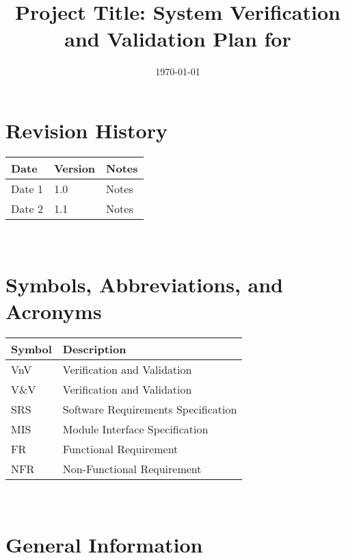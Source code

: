 \documentclass[12pt, titlepage]{article}
\begin{document}
\title{Project Title: System Verification and Validation Plan for \progname{}} 
\author{\authname}
\date{\today}
	
\maketitle


\section*{Revision History}

\begin{tabularx}{\textwidth}{p{3cm}p{2cm}X}
\toprule {\bf Date} & {\bf Version} & {\bf Notes}\\
\midrule
Date 1 & 1.0 & Notes\\
Date 2 & 1.1 & Notes\\
\bottomrule
\end{tabularx}

~\\

\newpage

\tableofcontents

\listoftables

\newpage

\section{Symbols, Abbreviations, and Acronyms}

\renewcommand{\arraystretch}{1.2}
\begin{tabular}{l l} 
  \toprule		
  \textbf{Symbol} & \textbf{Description}\\
  \midrule 
  VnV & Verification and Validation\\
  V\&V & Verification and Validation\\
  SRS & Software Requirements Specification\\
  MIS & Module Interface Specification \\
  FR & Functional Requirement \\
  NFR & Non-Functional Requirement \\
  \bottomrule
\end{tabular}\\

\newpage


\section{General Information}
\end{document}
